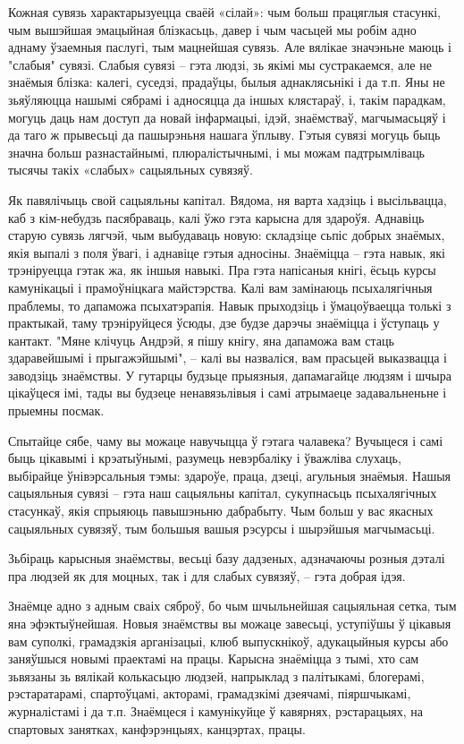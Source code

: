 Кожная сувязь характарызуецца сваёй «сілай»: чым больш працяглыя стасункі, чым вышэйшая эмацыйная блізкасьць, давер і чым часьцей мы робім адно аднаму ўзаемныя паслугі, тым мацнейшая сувязь. Але вялікае значэньне маюць і "слабыя" сувязі. Слабыя сувязі – гэта людзі, зь якімі мы сустракаемся, але не знаёмыя блізка: калегі, суседзі, прадаўцы, былыя аднаклясьнікі і да т.п. Яны не зьяўляюцца нашымі сябрамі і адносяцца да іншых клястараў, і, такім парадкам, могуць даць нам доступ да новай інфармацыі, ідэй, знаёмстваў, магчымасьцяў і да таго ж прывесьці да пашырэньня нашага ўплыву. Гэтыя сувязі могуць быць значна больш разнастайнымі, плюралістычнымі, і мы можам падтрымліваць тысячы такіх «слабых» сацыяльных сувязяў.

Як павялічыць свой сацыяльны капітал. Вядома, ня варта хадзіць і высільвацца, каб з кім-небудзь пасябраваць, калі ўжо гэта карысна для здароўя. Аднавіць старую сувязь лягчэй, чым выбудаваць новую: складзіце сьпіс добрых знаёмых, якія выпалі з поля ўвагі, і аднавіце гэтыя адносіны. Знаёміцца – гэта навык, які трэніруецца гэтак жа, як іншыя навыкі. Пра гэта напісаныя кнігі, ёсьць курсы камунікацыі і прамоўніцкага майстэрства. Калі вам замінаюць псыхалягічныя праблемы, то дапаможа псыхатэрапія. Навык прыходзіць і ўмацоўваецца толькі з практыкай, таму трэніруйцеся ўсюды, дзе будзе дарэчы знаёміцца і ўступаць у кантакт. "Мяне клічуць Андрэй, я пішу кнігу, яна дапаможа вам стаць здаравейшымі і прыгажэйшымі", – калі вы назваліся, вам прасьцей выказвацца і заводзіць знаёмствы. У гутарцы будзьце прыязныя, дапамагайце людзям і шчыра цікаўцеся імі, тады вы будзеце ненавязьлівыя і самі атрымаеце задавальненьне і прыемны посмак.

Спытайце сябе, чаму вы можаце навучыцца ў гэтага чалавека? Вучыцеся і самі быць цікавымі і крэатыўнымі, разумець невэрбаліку і ўважліва слухаць, выбірайце ўнівэрсальныя тэмы: здароўе, праца, дзеці, агульныя знаёмыя. Нашыя сацыяльныя сувязі – гэта наш сацыяльны капітал, сукупнасьць псыхалягічных стасункаў, якія спрыяюць павышэньню дабрабыту. Чым больш у вас якасных сацыяльных сувязяў, тым большыя вашыя рэсурсы і шырэйшыя магчымасьці.

Зьбіраць карысныя знаёмствы, весьці базу дадзеных, адзначаючы розныя дэталі пра людзей як для моцных, так і для слабых сувязяў, – гэта добрая ідэя.

Знаёмце адно з адным сваіх сяброў, бо чым шчыльнейшая сацыяльная сетка, тым яна эфэктыўнейшая. Новыя знаёмствы вы можаце завесьці, уступіўшы ў цікавыя вам суполкі, грамадзкія арганізацыі, клюб выпускнікоў, адукацыйныя курсы або заняўшыся новымі праектамі на працы. Карысна знаёміцца з тымі, хто сам зьвязаны зь вялікай колькасьцю людзей, напрыклад з палітыкамі, блогерамі, рэстаратарамі, спартоўцамі, акторамі, грамадзкімі дзеячамі, піяршчыкамі, журналістамі і да т.п. Знаёмцеся і камунікуйце ў кавярнях, рэстарацыях, на спартовых занятках, канфэрэнцыях, канцэртах, працы.

